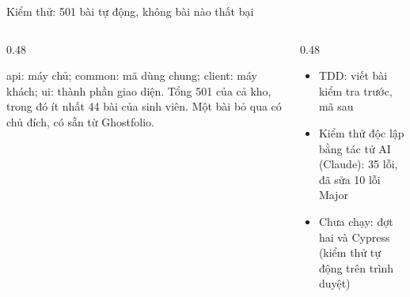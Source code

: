 \documentclass[aspectratio=169,10pt]{beamer}
\let\small\normalsize
\begin{document}
\begin{frame}[t]{Kiểm thử: 501 bài tự động, không bài nào thất bại}
  \begin{columns}[T]
    \begin{column}{0.48\textwidth}
      \centering

      {\small api: máy chủ; common: mã dùng chung; client: máy khách; ui: thành phần giao diện. Tổng 501 của cả kho, trong đó ít nhất 44 bài của sinh viên. Một bài bỏ qua có chủ đích, có sẵn từ Ghostfolio.}
    \end{column}
    \begin{column}{0.48\textwidth}
      \begin{itemize}
        \item TDD: viết bài kiểm tra trước, mã sau
        \item Kiểm thử độc lập bằng tác tử AI (Claude): 35 lỗi, đã sửa 10 lỗi Major
        \item Chưa chạy: đợt hai và Cypress (kiểm thử tự động trên trình duyệt)
      \end{itemize}
    \end{column}
  \end{columns}

\end{frame}
\end{document}
